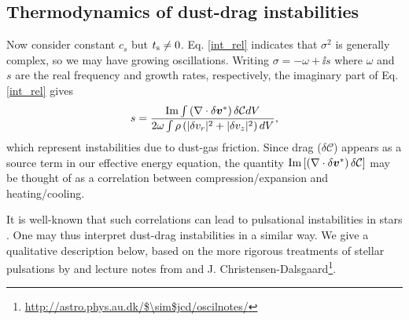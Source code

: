 \subsection{Thermodynamics of dust-drag instabilities}\label{dust_work}
Now consider constant $c_s$ but $t_\mathrm{s}\neq0$. 
Eq. \ref{int_rel} indicates that $\sigma^2$ is generally complex, so
we may have growing oscillations. Writing $\sigma = -\omega + \ii s$
where $\omega$ and $s$ are the real frequency and growth rates, 
respectively, the imaginary part of Eq. \ref{int_rel} gives 
\begin{align}
  s = \frac{\operatorname{Im}\int \left(\nabla\cdot\delta\bm{v}^*\right)\delta\mathcal{C}dV}{2\omega\int\rho\left(|\delta
    v_r|^2 + |\delta v_z|^2\right)dV}, \label{thermal_instability}
\end{align}
which represent instabilities due to dust-gas friction. 
 Since drag ($\delta \mathcal{C}$) appears as a source term in our
effective energy equation, the quantity 
$\operatorname{Im}\left[\left(\nabla\cdot\delta\bm{v}^*\right)\delta\mathcal{C}\right]$
may be thought of as a correlation between compression/expansion and  
heating/cooling. 

It is well-known that such correlations can lead to pulsational
instabilities in stars \citep{cox67}. One may thus interpret 
dust-drag instabilities in a similar way. We give a
qualitative 
description below, based on the more rigorous treatments of stellar 
pulsations by 
\cite{cox67} and lecture notes from \cite{samadi15} and
J. Christensen-Dalsgaard\footnote{\url{http://astro.phys.au.dk/$\sim$jcd/oscilnotes/}}.      

